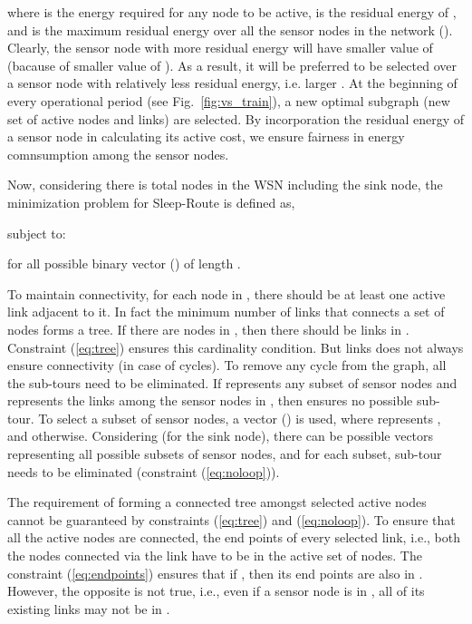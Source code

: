 \documentclass[conference]{IEEEtran}
\begin{document}
where  is the energy required for any node to be active,  is the residual energy of , and  is the maximum residual energy over all the sensor nodes in the network (). Clearly, the sensor node with more residual energy will have smaller value of  (bacause of smaller value of ). As a result, it will be preferred to be selected over a sensor node with relatively less residual energy, i.e. larger . At the beginning of every operational period (see Fig.~\ref{fig:vs_train}), a new optimal subgraph (new set of active nodes and links) are selected. By incorporation the residual energy of a sensor node in calculating its active cost, we ensure fairness in energy comnsumption among the sensor nodes.

Now, considering there is total  nodes in the WSN including the sink node, the minimization problem for Sleep-Route is defined as, 


subject to:

for all possible binary vector () of length .



To maintain connectivity, for each node in , there should be at least one active link adjacent to it. In fact the minimum number of links that connects a set of nodes forms a tree. If there are  nodes in , then there should be  links in . Constraint (\ref{eq:tree}) ensures this cardinality condition. But  links does not always ensure connectivity (in case of cycles). To remove any cycle from the graph, all the sub-tours need to be eliminated. If  represents any subset of sensor nodes and  represents the links among the sensor nodes in , then  ensures no possible sub-tour. To select a subset of sensor nodes, a vector () is used, where  represents , and  otherwise. Considering  (for the sink node), there can be  possible vectors representing all possible subsets of sensor nodes, and for each subset, sub-tour needs to be eliminated (constraint (\ref{eq:noloop})).

The requirement of forming a connected tree amongst selected active nodes cannot be guaranteed by constraints (\ref{eq:tree}) and (\ref{eq:noloop}). To ensure that all the active nodes are connected, the end points of every selected link, i.e., both the nodes connected via the link have to be in the active set of nodes. The constraint (\ref{eq:endpoints}) ensures that if , then its end points are also in . However, the opposite is not true, i.e., even if a sensor node is in , all of its existing links may not be in .  
\end{document}
